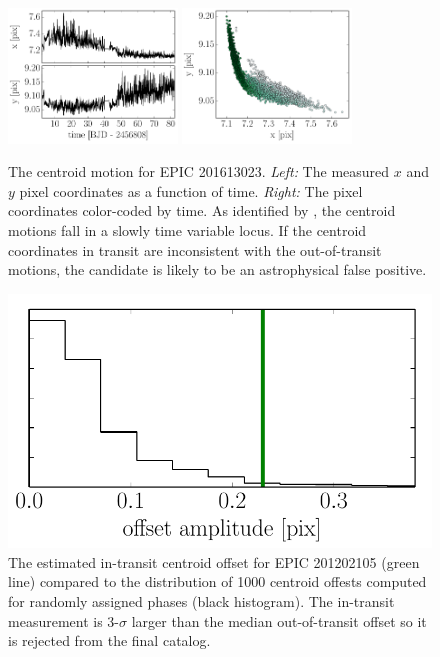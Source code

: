 \begin{figure}[p]
\begin{center}
\includegraphics[width=0.4\textwidth]{figures/ketu/centroid.pdf}
\includegraphics[width=0.4\textwidth]{figures/ketu/centroid-2.pdf}
\end{center}
\caption{%
The centroid motion for EPIC 201613023.
\emph{Left:} The measured $x$ and $y$ pixel coordinates as a function of time.
\emph{Right:} The pixel coordinates color-coded by time.
As identified by \citet{Vanderburg:2014}, the centroid motions fall in a
slowly time variable locus.
If the centroid coordinates in transit are inconsistent with the
out-of-transit motions, the candidate is likely to be an astrophysical false
positive.
}
\end{figure}

\begin{figure}[p]
\begin{center}
\includegraphics{figures/ketu/offsets.pdf}
\end{center}
\caption{%
The estimated in-transit centroid offset for EPIC 201202105 (green line)
compared to the distribution of 1000 centroid offests computed for randomly
assigned phases (black histogram).
The in-transit measurement is 3-$\sigma$ larger than the median out-of-transit
offset so it is rejected from the final catalog.
}
\end{figure}


